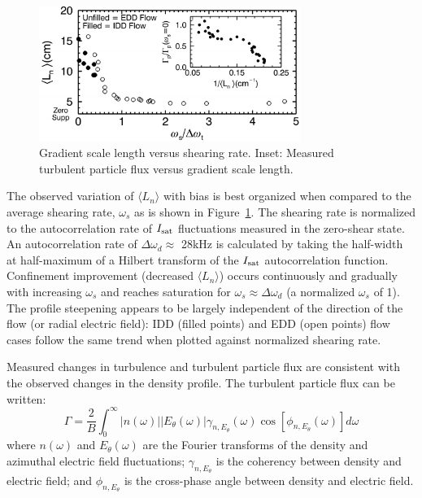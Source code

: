\documentclass[aps,prl,amsmath,amssymb,preprint,superscriptaddress]{revtex4}
\begin{document}
\begin{figure}[!htbp]
\centerline{
\includegraphics[width=8.5cm]{shearandgrad.pdf}}
\caption{\label{fig:shearandgrad} Gradient scale length versus
  shearing rate. Inset: Measured turbulent particle flux versus
  gradient scale length.}
\end{figure}

The observed variation of $\langle L_{n} \rangle$ with bias is best
organized when compared to the average shearing rate, $\omega_s$ as is
shown in Figure~\ref{fig:shearandgrad}.   The shearing rate is
normalized to the autocorrelation rate of $I_{\rm sat}$ fluctuations
measured in the zero-shear state.  An autocorrelation rate of $\Delta
\omega_{d} \approx $ 28kHz is calculated by taking the half-width at
half-maximum of a Hilbert transform of the $I_{\rm sat}$
autocorrelation function.  Confinement improvement (decreased $\langle
L_n \rangle$) occurs continuously and gradually with increasing
$\omega_{s}$ and reaches saturation for $\omega_{s} \approx \Delta
\omega_{d}$ (a normalized $\omega_s$ of 1).  The profile steepening
appears to be largely independent of the direction of the flow (or radial electric field): IDD (filled points) and EDD (open points) flow cases follow the same trend when plotted against normalized shearing rate.

Measured changes in turbulence and turbulent particle flux are
consistent with the observed changes in the density profile.  The
turbulent particle flux can be written\cite{powers74}:
\begin{equation}
\Gamma = \frac{2}{B} \int^{\infty}_{0} \lvert n(\omega) \rvert \lvert E_{\theta}(\omega) \rvert \gamma_{n,E_{\theta}}(\omega) \cos [\phi_{n,E_{\theta}}(\omega)] d\omega
\label{eq:fluxint}
\end{equation}
where $n(\omega)$ and $E_\theta(\omega)$ are the Fourier transforms of
the density and azimuthal electric field fluctuations;
$\gamma_{n,E_\theta}$ is the coherency between density and electric
field; and $\phi_{n,E_\theta}$ is the cross-phase angle between
density and electric field.
\end{document}
